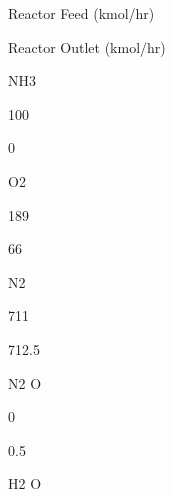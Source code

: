 \documentclass[a4paper,portrait,12pt]{article}
\begin{document}
\begin{flushleft}
Reactor Feed (kmol/hr)
\end{flushleft}





\begin{flushleft}
Reactor Outlet (kmol/hr)
\end{flushleft}





\begin{flushleft}
NH3
\end{flushleft}





100





0





\begin{flushleft}
O2
\end{flushleft}





189





66





\begin{flushleft}
N2
\end{flushleft}





711





712.5





\begin{flushleft}
N2 O
\end{flushleft}





0





0.5





\begin{flushleft}
H2 O
\end{flushleft}
\end{document}
